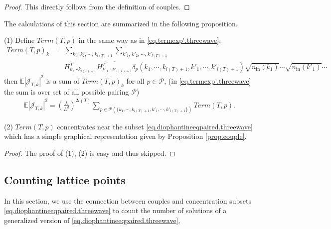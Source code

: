 \begin{proof}
This directly follows from the definition of couples. 
\end{proof}


The calculations of this section are summarized in the following proposition.  

\begin{prop}\label{prop.termcouple} (1) Define $Term(T,p)$ in the same way as in \eqref{eq.termexp'.threewave},
\begin{equation}\label{eq.termTp.threewave}
\begin{split}
    Term(T, p)_k=&\sum_{k_1,\, k_2,\, \cdots,\, k_{l(T)+1}}\sum_{k'_1,\, k'_2,\, \cdots,\, k'_{l(T)+1}}
    \\
    &H^T_{k_1\cdots k_{l(T)+1}} \overline{H^{T}_{k'_1\cdots k'_{l(T)+1}}} \delta_{p}(k_1,\cdots, k_{l(T)+1}, k'_1,\cdots, k'_{l(T)+1})\sqrt{n_{\textrm{in}}(k_1)}\cdots\sqrt{n_{\textrm{in}}(k'_1)}\cdots
\end{split}
\end{equation}
then $\mathbb{E}|\mathcal{J}_{T,k}|^2$ is a sum of $Term(T,p)_k$ for all $p\in \mathcal{P}$, (in \eqref{eq.termexp'.threewave} the sum is over set of all possible pairing $\mathcal{P}$)
\begin{equation}\label{eq.termexp.threewave}
\begin{split}
    \mathbb{E}|\mathcal{J}_{T,k}|^2=\left(\frac{\lambda}{L^{d}}\right)^{2l(T)}
    \sum_{p\in \mathcal{P}(\{k_1,\cdots, k_{l(T)+1}, k'_1,\cdots, k'_{l(T)+1}\})} Term(T, p).
\end{split}
\end{equation}

(2) $Term(T,p)$ concentrates near the subset \eqref{eq.diophantineeqpaired.threewave} which has a simple graphical representation given by Proposition \ref{prop.couple}. 
\end{prop}

\begin{proof} The proof of (1), (2) is easy and thus skipped. 
\end{proof}


\subsection{Counting lattice points}\label{sec.numbertheory} In this section, we use the connection between couples and concentration subsets \eqref{eq.diophantineeqpaired.threewave} to count the number of solutions of a generalized version of \eqref{eq.diophantineeqpaired.threewave},




